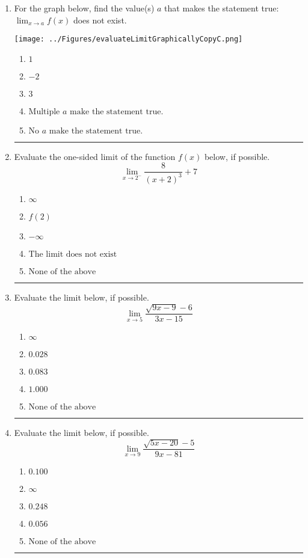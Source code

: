 \documentclass[14pt]{extbook}
\newcommand{\litem}[1]{\item#1\hspace*{-1cm}\rule{\textwidth}{0.4pt}}
\begin{document}
\begin{enumerate}
\litem{
For the graph below, find the value(s) $a$ that makes the statement true: $ \displaystyle \lim_{x \rightarrow a} f(x)$ does not exist.
\begin{center}
    \texttt{[image: ../Figures/evaluateLimitGraphicallyCopyC.png]}
\end{center}
\begin{enumerate}[label=\Alph*.]
\item \( 1 \)
\item \( -2 \)
\item \( 3 \)
\item \( \text{Multiple } a \text{ make the statement true}. \)
\item \( \text{No } a \text{ make the statement true}. \)

\end{enumerate} }
\litem{
Evaluate the one-sided limit of the function $f(x)$ below, if possible.\[ \lim_{x \rightarrow 2^-} \frac{8}{(x+2)^3}+7 \]\begin{enumerate}[label=\Alph*.]
\item \( \infty \)
\item \( f(2) \)
\item \( -\infty \)
\item \( \text{The limit does not exist} \)
\item \( \text{None of the above} \)

\end{enumerate} }
\litem{
Evaluate the limit below, if possible.\[ \lim_{x \rightarrow 5} \frac{\sqrt{9x - 9} - 6}{3x - 15} \]\begin{enumerate}[label=\Alph*.]
\item \( \infty \)
\item \( 0.028 \)
\item \( 0.083 \)
\item \( 1.000 \)
\item \( \text{None of the above} \)

\end{enumerate} }
\litem{
Evaluate the limit below, if possible.\[ \lim_{x \rightarrow 9} \frac{\sqrt{5x - 20} - 5}{9x - 81} \]\begin{enumerate}[label=\Alph*.]
\item \( 0.100 \)
\item \( \infty \)
\item \( 0.248 \)
\item \( 0.056 \)
\item \( \text{None of the above} \)


\end{enumerate}}
\end{enumerate}
\end{document}
